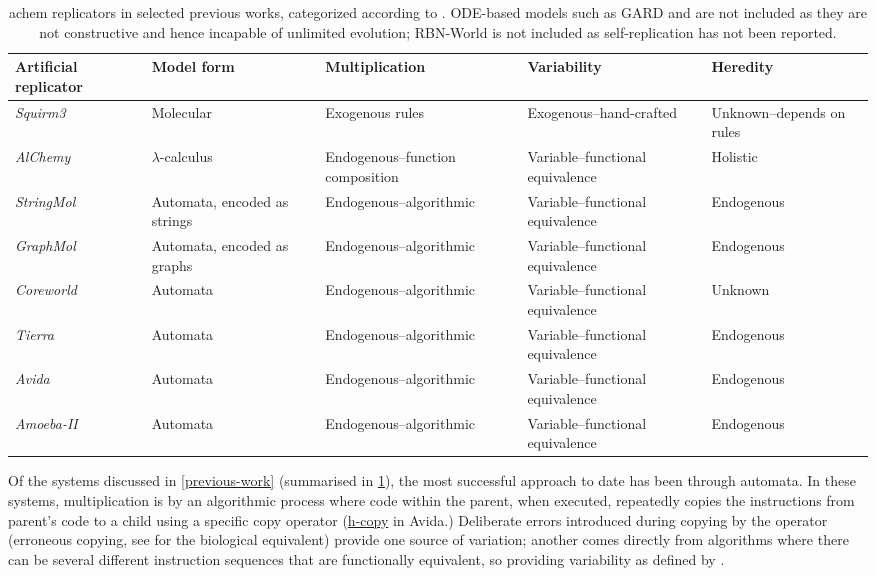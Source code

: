 \begin{table}
	\scriptsize
	\begin{center}
		\caption{\Gls{achem} replicators in selected previous works, categorized according to \textcite{Zachar2010}. ODE-based models such as GARD and \textcite{Vasas2012} are not included as they are not \gls{constructive} and hence incapable of unlimited evolution; RBN-World \parencite{Faulconbridge2010} is not included as self-replication has not been reported.}
		\label{tbl:previous-work}
		\begin{tabular}{@{}p{3.5cm}p{1.5cm}p{3.5cm}p{3.5cm}p{2cm}@{}}
			\toprule
			Artificial replicator            						& Model form					& Multiplication					& Variability						& Heredity\\ 
			\midrule
			\emph{Squirm3} \parencite{Hutton2002}                   & Molecular						& Exogenous rules					& Exogenous--hand-crafted			& Unknown--depends on rules\\
			\emph{AlChemy} \parencite{Fontana1992}					& $\lambda$-calculus			& Endogenous--function composition	& Variable--functional equivalence  & Holistic\\
			\emph{StringMol} \parencite{Hickinbotham2012}           & Automata, encoded as strings	& Endogenous--algorithmic			& Variable--functional equivalence	& Endogenous\\
			\emph{GraphMol} \parencite{Nellis2014}					& Automata, encoded as graphs	& Endogenous--algorithmic			& Variable--functional equivalence	& Endogenous\\
			\emph{Coreworld} \parencite{Rasmussen1990} 				& Automata						& Endogenous--algorithmic			& Variable--functional equivalence	& Unknown\\
			\emph{Tierra} \parencite{Ray1991} 						& Automata						& Endogenous--algorithmic			& Variable--functional equivalence	& Endogenous\\
			\emph{Avida} \parencite{Ofria2004} 						& Automata						& Endogenous--algorithmic			& Variable--functional equivalence	& Endogenous\\
			\emph{Amoeba-II} \parencite{Pargellis2001}				& Automata						& Endogenous--algorithmic			& Variable--functional equivalence	& Endogenous\\
			\bottomrule
		\end{tabular}
	\end{center}
\end{table}

Of the systems discussed in \cref{previous-work} (summarised in \cref{tbl:previous-work}), the most successful approach to date has been through automata. In these systems, multiplication is by an algorithmic process where code within the parent, when executed, repeatedly copies the instructions from parent's code to a child using a specific copy operator (\eg \url{h-copy} in Avida.) Deliberate errors introduced during copying by the operator (erroneous copying, see \textcite[p.16]{Zachar2010} for the biological equivalent) provide one source of variation; another comes directly from algorithms where there can be several different instruction sequences that are functionally equivalent, so providing variability as defined by \citeauthor{Zachar2010}.


